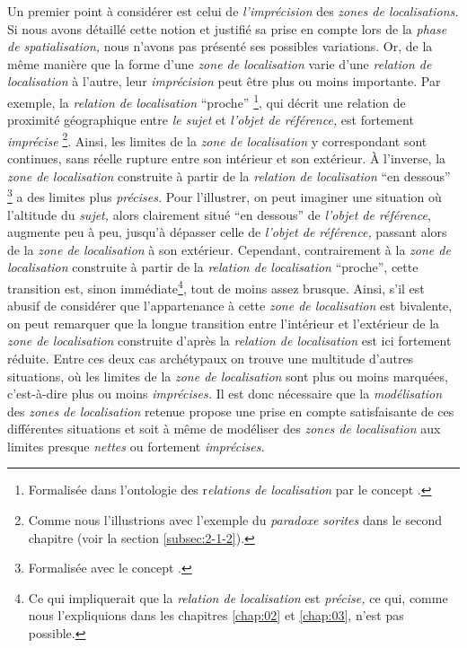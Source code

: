 Un premier point à considérer est celui de \emph{l'imprécision} des
\emph{zones de localisations.} Si nous avons détaillé cette notion et
justifié sa prise en compte lors de la \emph{phase de spatialisation,}
nous n'avons pas présenté ses possibles variations. Or, de la même
manière que la forme d'une \emph{zone de localisation} varie d'une
\emph{relation de localisation} à l'autre, leur \emph{imprécision}
peut être plus ou moins importante. Par exemple, la \emph{relation de
  localisation} \enquote{proche} \footnote{Formalisée dans l'ontologie
  des r\emph{elations de localisation} par le concept
  .}, qui décrit une relation de proximité
géographique entre \emph{le sujet} et \emph{l'objet de référence,} est
fortement \emph{imprécise} \footnote{Comme nous l'illustrions avec
  l'exemple du \emph{paradoxe sorites} dans le second chapitre (voir
  la section \ref{subsec:2-1-2}).}. Ainsi, les limites de la
\emph{zone de localisation} y correspondant sont continues, sans
réelle rupture entre son intérieur et son extérieur. À l'inverse, la
\emph{zone de localisation} construite à partir de la \emph{relation
  de localisation} \enquote{en dessous} \footnote{Formalisée avec le
  concept .} a des limites plus
\emph{précises.} Pour l'illustrer, on peut imaginer une situation où
l'altitude du \emph{sujet,} alors clairement situé \enquote{en
  dessous} de \emph{l'objet de référence}, augmente peu à peu, jusqu'à
dépasser celle de \emph{l'objet de référence,} passant alors de la
\emph{zone de localisation} à son extérieur. Cependant, contrairement
à la \emph{zone de localisation} construite à partir de la
\emph{relation de localisation} \enquote{proche}, cette transition
est, sinon immédiate\footnote{Ce qui impliquerait que la
  \emph{relation de localisation} est \emph{précise,} ce qui, comme
  nous l'expliquions dans les chapitres \ref{chap:02} et
  \ref{chap:03}, n'est pas possible.}, tout de moins assez
brusque. Ainsi, s'il est abusif de considérer que l'appartenance à
cette \emph{zone de localisation} est bivalente, on peut remarquer que
la longue transition entre l'intérieur et l'extérieur de la \emph{zone
  de localisation} construite d'après la \emph{relation de
  localisation}  est ici fortement réduite. Entre
ces deux cas archétypaux on trouve une multitude d'autres situations,
où les limites de la \emph{zone de localisation} sont plus ou moins
marquées, c'est-à-dire plus ou moins \emph{imprécises.} Il est donc
nécessaire que la \emph{modélisation} des \emph{zones de localisation}
retenue propose une prise en compte satisfaisante de ces différentes
situations et soit à même de modéliser des \emph{zones de
  localisation} aux limites presque \emph{nettes} ou fortement
\emph{imprécises.}

